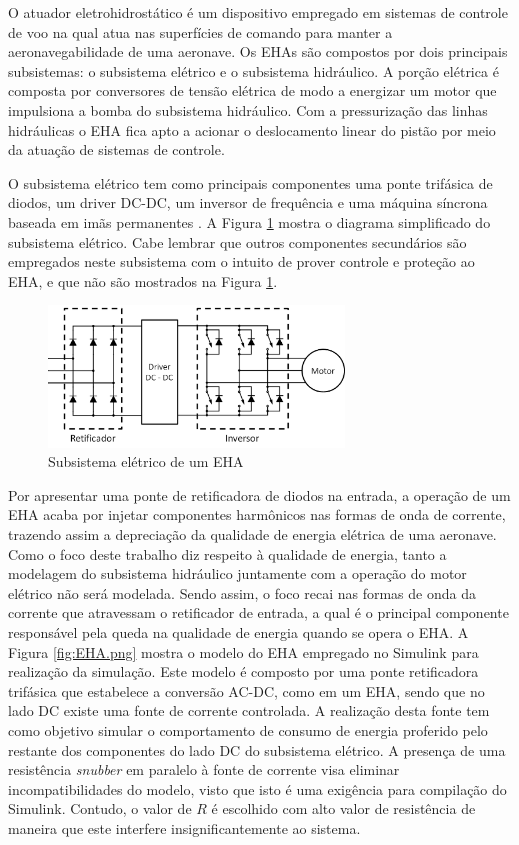 O atuador eletrohidrostático é um dispositivo empregado em sistemas de controle de voo na qual atua nas superfícies de comando para manter a aeronavegabilidade de uma aeronave. Os EHAs são compostos por dois principais subsistemas: o subsistema elétrico e o subsistema hidráulico. A porção elétrica é composta por conversores de tensão elétrica de modo a energizar um motor que impulsiona a bomba do subsistema hidráulico. Com a pressurização das linhas hidráulicas o EHA fica apto a acionar o deslocamento linear do pistão por meio da atuação de sistemas de controle.

O subsistema elétrico tem como principais componentes uma ponte trifásica de diodos, um driver DC-DC, um inversor de frequência e uma máquina síncrona baseada em imãs permanentes \cite{Dinca2014}. A Figura \ref{fig:EHA_elec.png} mostra o diagrama simplificado do subsistema elétrico. Cabe lembrar que outros componentes secundários são empregados neste subsistema com o intuito de prover controle e proteção ao EHA, e que não são mostrados na Figura \ref{fig:EHA_elec.png}.

\begin{figure}[!htb] %
	\centering
	\includegraphics[width=0.7\textwidth]{Cap4/Figuras/EHA_elec.png}
	\caption{Subsistema elétrico de um EHA}
	\label{fig:EHA_elec.png}
\end{figure}  

Por apresentar uma ponte de retificadora de diodos na entrada, a operação de um EHA acaba por injetar componentes harmônicos nas formas de onda de corrente, trazendo assim a depreciação da qualidade de energia elétrica de uma aeronave. Como o foco deste trabalho diz respeito à qualidade de energia, tanto a modelagem do subsistema hidráulico juntamente com a operação do motor elétrico não será modelada. Sendo assim, o foco recai nas formas de onda da corrente que atravessam o retificador de entrada, a qual é o principal componente responsável pela queda na qualidade de energia quando se opera o EHA. A Figura \ref{fig:EHA.png} mostra o modelo do EHA empregado no Simulink para realização da simulação. Este modelo é composto por uma ponte retificadora trifásica que estabelece a conversão AC-DC, como em um EHA, sendo que no lado DC existe uma fonte de corrente controlada. A realização desta fonte tem como objetivo simular o comportamento de consumo de energia proferido pelo restante dos componentes do lado DC do subsistema elétrico. A presença de uma resistência \textit{snubber} em paralelo à fonte de corrente visa eliminar incompatibilidades do modelo, visto que isto é uma exigência para compilação do Simulink. Contudo, o valor de $R$ é escolhido com alto valor de resistência de maneira que este interfere insignificantemente ao sistema.

